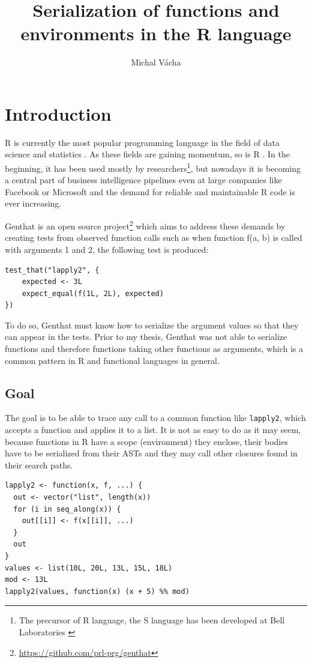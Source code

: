 \documentclass[thesis=B,english]{FITthesis}[2012/10/20]
\title{Serialization of functions and environments in the R language}
\author{Michal Vácha} %
\begin{document}

\chapter{Introduction}

R is currently the most popular programming language in the field of data science and statistics \cite{ieeeTop}. As these fields are gaining momentum, so is R \cite{soTrends}. In the beginning, it has been used mostly by researchers\footnote{The precursor of R language, the S language has been developed at Bell Laboratories \cite{langS}}, but nowadays it is becoming a central part of business intelligence pipelines even at large companies like Facebook or Microsoft\cite{usingR} and the demand for reliable and maintainable R code is ever increasing.

Genthat is an open source project\footnote{\url{https://github.com/prl-prg/genthat}} which aims to address these demands by creating tests from observed function calls such as when function f(a, b) is called with arguments 1 and 2, the following test is produced:

\begin{verbatim}
test_that("lapply2", {
    expected <- 3L
    expect_equal(f(1L, 2L), expected)
})
\end{verbatim}

To do so, Genthat must know how to serialize the argument values so that they can appear in the tests. Prior to my thesis, Genthat was not able to serialize functions and therefore functions taking other functions as arguments, which is a common pattern in R and functional languages in general.

\section{Goal}
The goal is to be able to trace any call to a common function like \verb|lapply2|\cite{advR}, which accepts a function and applies it to a list. It is not as easy to do as it may seem, because functions in R have a scope (environment) they enclose, their bodies have to be serialized from their ASTs and they may call other closures found in their search paths.

\begin{verbatim}
lapply2 <- function(x, f, ...) {
  out <- vector("list", length(x))
  for (i in seq_along(x)) {
    out[[i]] <- f(x[[i]], ...)
  }
  out
}
values <- list(10L, 20L, 13L, 15L, 18L)
mod <- 13L
lapply2(values, function(x) (x + 5) %% mod)
\end{verbatim}
\end{document}
